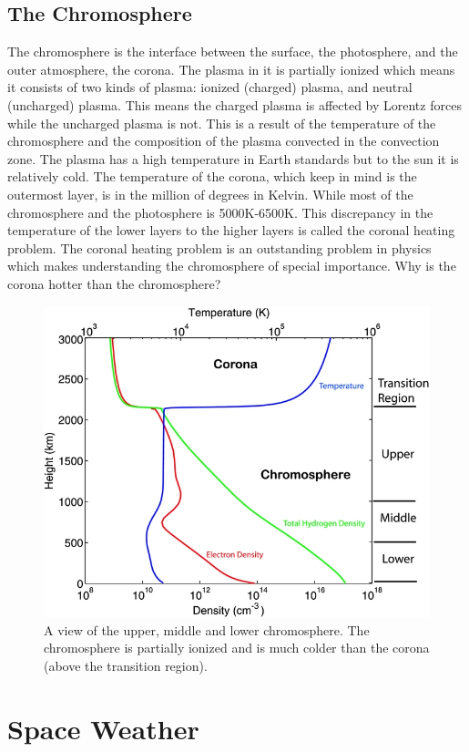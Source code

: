 \documentclass[12pt,upcase]{umlthesis}
\begin{document}
\subsection{The Chromosphere}

The chromosphere is the interface between the surface, the photosphere, and the outer atmosphere, the corona. The plasma in it is partially ionized which means it consists of two kinds of plasma: ionized (charged) plasma, and neutral (uncharged) plasma. This means the charged plasma is affected by Lorentz forces while the uncharged plasma is not. This is a result of the temperature of the chromosphere and the composition of the plasma convected in the convection zone. The plasma has a high temperature in Earth standards but to the sun it is relatively cold. The temperature of the corona, which keep in mind is the outermost layer, is in the million of degrees in Kelvin. While most of the chromosphere and the photosphere is 5000K-6500K. This discrepancy in the temperature of the lower layers to the higher layers is called the coronal heating problem. The coronal heating problem is an outstanding problem in physics which makes understanding the chromosphere of special importance. Why is the corona hotter than the chromosphere?

\begin{figure}[ht!]\label{fig:chromoprofile}
	\centering
	\includegraphics[width=0.75\linewidth]{chromoprofile.jpg}
	\caption{A view of the upper, middle and lower chromosphere. The chromosphere is partially ionized and is much colder than the corona (above the transition region).~\citep{Song2014,Avrett2008}}
\end{figure}


\section{Space Weather}
\end{document}
